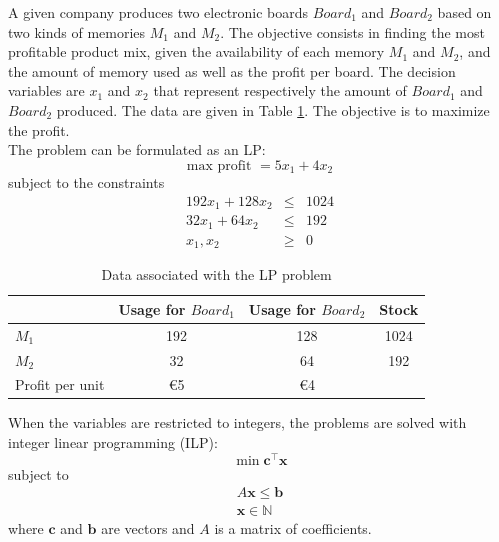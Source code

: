 \begin{example}
A given company produces two electronic boards $Board_1$ and $Board_2$ based on two kinds of memories $M_1$ and $M_2$. The objective consists in finding the most profitable product mix, given the availability of each memory $M_1$ and $M_2$, and the amount of memory used as well as the profit per board. The decision variables are $x_1$ and $x_2$ that represent respectively the amount of $Board_1$ and $Board_2$ produced. The data are given in Table \ref{tab:ex_lp}. The objective is to maximize the profit.\\
The problem can be formulated as an LP:
\begin{equation}
\text{max profit } = 5x_1 + 4x_2
\end{equation}
subject to the constraints
\begin{eqnarray*}
192x_1 + 128 x_2 &\leq& 1024\\
32x_1 + 64 x_2 &\leq& 192\\
x_1, x_2 &\geq& 0
\end{eqnarray*}
\end{example}

\begin{table}[h!]
\begin{center}
\caption{Data associated with the LP problem}
\begin{tabular}{|l|c|c|c|}
\hline
& Usage for $Board_1$ & Usage for $Board_2$ & Stock\\
\hline
$M_1$ & 192 & 128 & 1024 \\
$M_2$ & 32 & 64 & 192 \\
Profit per unit & \euro 5 & \euro 4 & \\
\hline
\end{tabular}
\label{tab:ex_lp}
\end{center}
\end{table}

When the variables are restricted to integers, the problems are solved with integer linear programming (ILP):
\begin{equation}
\min \mathbf{c}^\intercal\mathbf{x}
\end{equation}
subject to
\begin{equation*}
\begin{gathered}
A\mathbf{x} \leq \mathbf{b}\\
\mathbf{x} \in \mathbb{N}
\end{gathered}
\end{equation*}
where $\mathbf{c}$ and $\mathbf{b}$ are vectors and $A$ is a matrix of coefficients.

